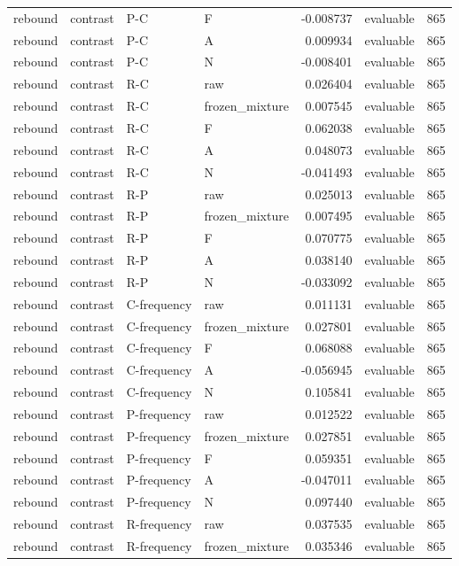 \begin{longtable}{llllrlr}
rebound & contrast & P-C & F & -0.008737 & evaluable & 865 \\
rebound & contrast & P-C & A & 0.009934 & evaluable & 865 \\
rebound & contrast & P-C & N & -0.008401 & evaluable & 865 \\
rebound & contrast & R-C & raw & 0.026404 & evaluable & 865 \\
rebound & contrast & R-C & frozen\_mixture & 0.007545 & evaluable & 865 \\
rebound & contrast & R-C & F & 0.062038 & evaluable & 865 \\
rebound & contrast & R-C & A & 0.048073 & evaluable & 865 \\
rebound & contrast & R-C & N & -0.041493 & evaluable & 865 \\
rebound & contrast & R-P & raw & 0.025013 & evaluable & 865 \\
rebound & contrast & R-P & frozen\_mixture & 0.007495 & evaluable & 865 \\
rebound & contrast & R-P & F & 0.070775 & evaluable & 865 \\
rebound & contrast & R-P & A & 0.038140 & evaluable & 865 \\
rebound & contrast & R-P & N & -0.033092 & evaluable & 865 \\
rebound & contrast & C-frequency & raw & 0.011131 & evaluable & 865 \\
rebound & contrast & C-frequency & frozen\_mixture & 0.027801 & evaluable & 865 \\
rebound & contrast & C-frequency & F & 0.068088 & evaluable & 865 \\
rebound & contrast & C-frequency & A & -0.056945 & evaluable & 865 \\
rebound & contrast & C-frequency & N & 0.105841 & evaluable & 865 \\
rebound & contrast & P-frequency & raw & 0.012522 & evaluable & 865 \\
rebound & contrast & P-frequency & frozen\_mixture & 0.027851 & evaluable & 865 \\
rebound & contrast & P-frequency & F & 0.059351 & evaluable & 865 \\
rebound & contrast & P-frequency & A & -0.047011 & evaluable & 865 \\
rebound & contrast & P-frequency & N & 0.097440 & evaluable & 865 \\
rebound & contrast & R-frequency & raw & 0.037535 & evaluable & 865 \\
rebound & contrast & R-frequency & frozen\_mixture & 0.035346 & evaluable & 865 \\

\end{longtable}
